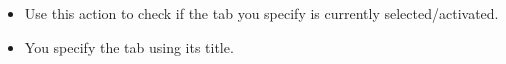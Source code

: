 \begin{itemize}
\item Use this action to check if the tab you specify is currently selected/activated. 
\item You specify the tab using its title. 
\end{itemize}
